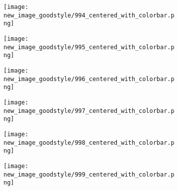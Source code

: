 \documentclass[a4paper,12pt]{article}
\begin{document}
\begin{figure}[H]
  \begin{subfigure}{0.11\textwidth}
    \texttt{[image: new\_image\_goodstyle/994\_centered\_with\_colorbar.png]}
  \end{subfigure}
  \hfill
  \begin{subfigure}{0.11\textwidth}
    \texttt{[image: new\_image\_goodstyle/995\_centered\_with\_colorbar.png]}
  \end{subfigure}
  \hfill
  \begin{subfigure}{0.11\textwidth}
    \texttt{[image: new\_image\_goodstyle/996\_centered\_with\_colorbar.png]}
  \end{subfigure}
  \hfill
  \begin{subfigure}{0.11\textwidth}
    \texttt{[image: new\_image\_goodstyle/997\_centered\_with\_colorbar.png]}
  \end{subfigure}
  \hfill
  \begin{subfigure}{0.11\textwidth}
    \texttt{[image: new\_image\_goodstyle/998\_centered\_with\_colorbar.png]}
  \end{subfigure}
  \hfill
  \begin{subfigure}{0.11\textwidth}
    \texttt{[image: new\_image\_goodstyle/999\_centered\_with\_colorbar.png]}
  \end{subfigure}
  \hfill
\end{figure}
\end{document}
